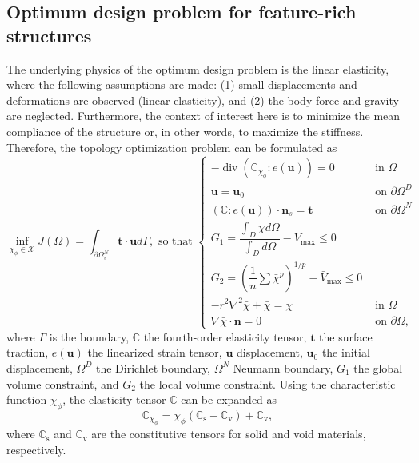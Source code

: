 \begin{subappendices}
\subsection{Optimum design problem for feature-rich structures}\label{Section: topology optimization problem}

The underlying physics of the optimum design problem is the linear elasticity, where the following assumptions are made: (1) small displacements and deformations are observed (linear elasticity), and (2) the body force and gravity are neglected. Furthermore, the context of interest here is to minimize the mean compliance of the structure or, in other words, to maximize the stiffness. Therefore, the topology optimization problem can be formulated as
\begin{subequations}
	\begin{equation}
		\inf _{\chi_{\phi} \in \mathcal{X}} J(\Omega)=\int_{\partial \Omega_{s}^{N}} \boldsymbol{t} \cdot \boldsymbol{u} d \Gamma,
		\label{eq: objective function}
	\end{equation}
	\begin{equation}
		\text { so that }\left\{\begin{array}{ll}
			-\operatorname{div}(\mathbb{C}_{\chi_{\phi}} : e(\boldsymbol{u}))=0 & \text { in } \Omega \\
			\boldsymbol{u}=\boldsymbol{u}_{0} & \text { on } \partial \Omega^{D} \\
			(\mathbb{C}: e(\boldsymbol{u})) \cdot \boldsymbol{n}_{s}=\mathbf{t} & \text { on } \partial \Omega^{N} \\
			G_{1}=\dfrac{\int_{D} \chi d \Omega}{\int_{D} d \Omega}-V_{\max } \leq 0 & \\
			G_2=\left(\dfrac{1}{n} \sum \bar{\chi}^{p}\right)^{1 / p}-\bar{V}_{\max } \leq 0 & \\
			-r^2 \nabla^2 \bar{\chi} +  \bar{\chi} =  \chi & \text{ in } \Omega \\
			\nabla \bar{\chi} \cdot \boldsymbol{n} = 0 & \text{ on } \partial \Omega,
		\end{array}\right.
		\label{eq: governing equation and constraints}
	\end{equation}
	\label{eq: topology optimization mathematical model}
\end{subequations}
where $\Gamma$ is the boundary, $\mathbb{C}$ the fourth-order elasticity tensor, $\boldsymbol{t}$ the surface traction, $e\left(\boldsymbol{u}\right)$ the linearized strain tensor, $\boldsymbol{u}$ displacement, $\boldsymbol{u}_0$ the initial displacement, $\Omega^{D}$ the Dirichlet boundary, $\Omega^{N}$ Neumann boundary, $G_1$ the global volume constraint, and $G_2$ the local volume constraint. Using the characteristic function $\chi_{\phi}$, the elasticity tensor $\mathbb{C}$ can be expanded as
\begin{equation}
	\mathbb{C}_{\chi_{\phi}} = \chi_{\phi} \left(\mathbb{C}_{\text{s}} - \mathbb{C}_{\text{v}} \right) + \mathbb{C}_{\text{v}},
\end{equation}
where $\mathbb{C}_{\text{s}}$ and $\mathbb{C}_{\text{v}}$ are the constitutive tensors for solid and void materials, respectively. 


\end{subappendices}

